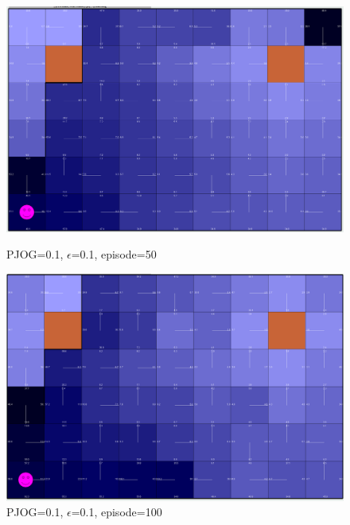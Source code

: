 \documentclass[11pt]{article}
\begin{document}
\begin{figure}[!htb]
   \begin{minipage}{0.34\textwidth}
     \centering
     \includegraphics[width=1.2\linewidth]{../figures/q1_1_50.png}
     \caption{PJOG=0.1, $\epsilon$=0.1, episode=50}\label{Fig:q1_1_50}
   \end{minipage}\hfill
   \begin{minipage}{0.34\textwidth}
     \centering
     \includegraphics[width=1.2\linewidth]{../figures/q1_1_100.png}
     \caption{PJOG=0.1, $\epsilon$=0.1, episode=100}\label{Fig:q1_1_100}
   \end{minipage}
\end{figure}
\end{document}
